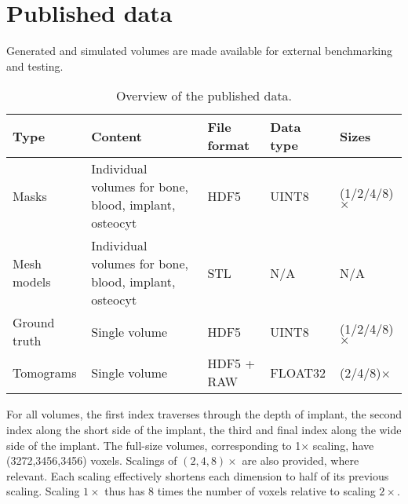 \section{Published data}
\label{sec:pubdata}

Generated and simulated volumes are made available for external benchmarking and testing.

\begin{table*}
    \caption{Overview of the published data.}
    \label{tab:pubdata}
    \centering
    \begin{tabular}{@{}p{2cm}p{5cm}p{2.5cm}p{2.5cm}p{2.5cm}@{}}
    \toprule
	    \textbf{Type} & \textbf{Content} & \textbf{File format} & \textbf{Data type} & \textbf{Sizes} \\
    \midrule
	    Masks & Individual volumes for bone, blood, implant, osteocyt & HDF5 & UINT8 & (1/2/4/8)$\times$ \\
	    Mesh models & Individual volumes for bone, blood, implant, osteocyt & STL & N/A & N/A \\
	    Ground truth & Single volume & HDF5 & UINT8 & (1/2/4/8)$\times$ \\
	    Tomograms & Single volume & HDF5 + RAW & FLOAT32 & (2/4/8)$\times$ \\
    \bottomrule
    \end{tabular}
\end{table*}

For all volumes, the first index traverses through the depth of implant, the second index along the short side of the implant, the third and final index along the wide side of the implant. The full-size volumes, corresponding to 1$\times$ scaling, have (3272,3456,3456) voxels. Scalings of $(2,4,8)\times$ are also provided, where relevant. Each scaling effectively shortens each dimension to half of its previous scaling. Scaling $1\times$ thus has 8 times the number of voxels relative to scaling $2\times$.







